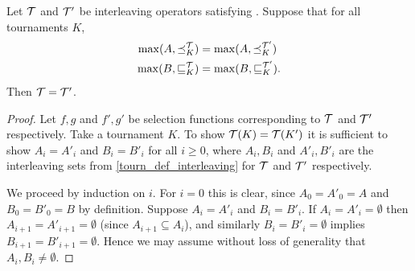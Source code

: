 \begin{proposition}
    \label{tourn_result_smi_maximal_ranks_equal}
    Let $\mathcal{T}$ and $\mathcal{T}'$ be interleaving operators satisfying \smi{}.
    Suppose that for all tournaments $K$,
    \begin{align*}
        \max(A, {\preceq_K^{\mathcal{T}}}) &= \max(A, \preceq_K^{\mathcal{T}'}) \\
        \max(B, {\sqsubseteq_K^{\mathcal{T}}}) &= \max(B, \sqsubseteq_K^{\mathcal{T}'}).
    \end{align*}
    Then $\mathcal{T} = \mathcal{T}'$.
\end{proposition}

\begin{proof}
    Let $f, g$ and $f', g'$ be selection functions corresponding to $\mathcal{T}$
    and $\mathcal{T}'$ respectively. Take a tournament $K$. To show $\mathcal{T}(K) =
    \mathcal{T}(K')$ it is sufficient to show $A_i = A'_i$ and $B_i = B'_i$ for all $i
    \ge 0$, where $A_i, B_i$ and $A'_i, B'_i$ are the interleaving sets from
    \cref{tourn_def_interleaving} for $\mathcal{T}$ and $\mathcal{T}'$ respectively.

    We proceed by induction on $i$. For $i = 0$ this is clear, since $A_0 =
    A'_0 = A$ and $B_0 = B'_0 = B$ by definition. Suppose $A_i = A'_i$ and $B_i
    = B'_i$. If $A_i = A'_i = \emptyset$ then $A_{i+1} = A'_{i+1} = \emptyset$
    (since $A_{i+1} \subseteq A_i$), and similarly $B_i = B'_i = \emptyset$
    implies $B_{i+1} = B'_{i+1} = \emptyset$. Hence we may assume without loss
    of generality that $A_i, B_i \ne \emptyset$.


\end{proof}
